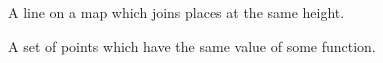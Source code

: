 A line on a map which joins places at the same height.
\par
A set of points which have the same value of some function.
